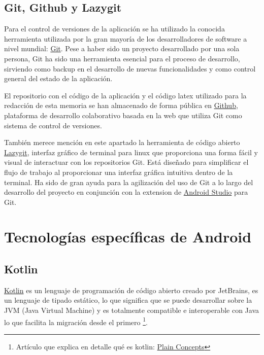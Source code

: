 \subsection{Git, Github y Lazygit}
Para el control de versiones de la aplicación se ha utilizado la conocida herramienta utilizada por la gran mayoría de los desarrolladores de software a nivel mundial: \href{https://git-scm.com/}{Git}. Pese a haber sido un proyecto desarrollado por una sola persona, Git ha sido una herramienta esencial para el proceso de desarrollo, sirviendo como backup en el desarrollo de nuevas funcionalidades y como control general del estado de la aplicación. 

El repositorio con el código de la aplicación y el código latex utilizado para la redacción de esta memoria se han almacenado de forma pública en \href{https://github.com/}{Github}, plataforma de desarrollo colaborativo basada en la web que utiliza Git como sistema de control de versiones.

También merece mención en este apartado la herramienta de código abierto \href{https://github.com/jesseduffield/lazygit}{Lazygit}, interfaz gráfico de terminal para linux que proporciona una forma fácil y visual de interactuar con los repositorios Git. Está diseñado para simplificar el flujo de trabajo al proporcionar una interfaz gráfica intuitiva dentro de la terminal. Ha sido de gran ayuda para la agilización del uso de Git a lo largo del desarrollo del proyecto en conjunción con la extension de \hyperlink{subsec:android_studio}{Android Studio} para Git.



\section{Tecnologías específicas de Android}

\hypertarget{subsec:kotlin}{}
\subsection{Kotlin}
\href{https://kotlinlang.org/}{Kotlin} es un lenguaje de programación de código abierto creado por JetBrains, es un lenguaje de tipado estático, lo que significa que se puede desarrollar sobre la JVM (Java Virtual Machine) y es totalmente compatible e interoperable con Java lo que facilita la migración desde el primero \footnote{Artículo que explica en detalle qué es kotlin: \href{https://www.plainconcepts.com/es/kotlin-android/}{Plain Concepts}}. 

